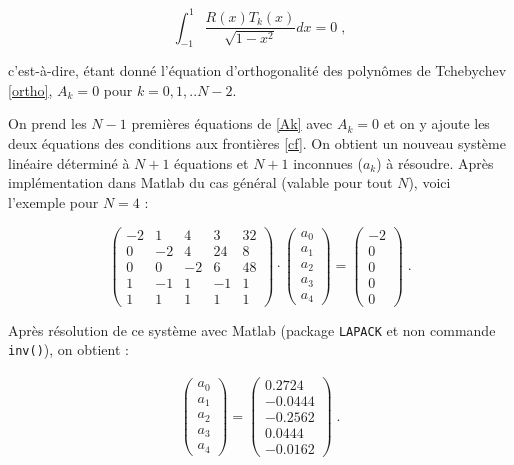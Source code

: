 \documentclass{report}
\begin{document}
\begin{equation}
\int_{-1}^1 \frac{R(x) T_k(x)}{\sqrt{1-x^2}} dx = 0\;,
\end{equation}

c'est-à-dire, étant donné l'équation d'orthogonalité des polynômes de Tchebychev \eqref{ortho}, $A_{k}=0$ pour $k=0,1,..N-2$.

On prend les $N-1$ premières équations de \eqref{Ak} avec $A_{k}=0$  et on y ajoute les deux équations des conditions aux frontières \eqref{cf}. On obtient un nouveau système linéaire déterminé à $N+1$ équations et $N+1$ inconnues ($a_{k}$) à résoudre. Après implémentation dans Matlab du cas général (valable pour tout $N$), voici l'exemple pour $N=4$ :

\begin{equation}
\begin{pmatrix}
-2 & 1 & 4 & 3 & 32\\ 
0 & -2 & 4 & 24 & 8\\ 
0 & 0 & -2 & 6 & 48\\ 
1 & -1 & 1 & -1 & 1\\ 
1 & 1 & 1 & 1 & 1
\end{pmatrix} \cdot \begin{pmatrix}
 a_0\\ 
 a_1\\ 
 a_2\\ 
 a_3\\ 
 a_4
\end{pmatrix} = 
\begin{pmatrix}
 -2\\ 
 0\\ 
 0\\ 
 0\\ 
 0
\end{pmatrix}\;.
\end{equation}

Après résolution de ce système avec Matlab (package \texttt{LAPACK} et non commande \texttt{inv()}), on obtient :

\begin{eqnarray}
\begin{pmatrix}
 a_0\\ 
 a_1\\ 
 a_2\\ 
 a_3\\ 
 a_4 
 \end{pmatrix}
 = \left(
\begin{array}{r}
  0.2724\\ 
 -0.0444\\ 
 -0.2562\\ 
 0.0444\\ 
 -0.0162 
 \end{array}\right)\;.
\end{eqnarray}  
\end{document}
